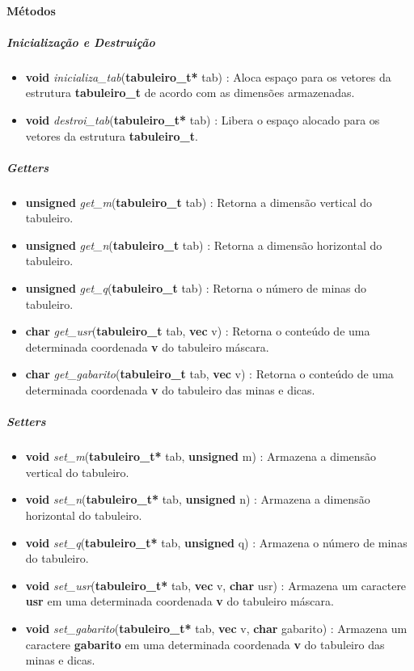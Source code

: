 \documentclass[10pt,a4paper]{report}
\begin{document}
\paragraph{Métodos}
\subparagraph{Inicialização e Destruição}
\begin{itemize}
\item \textbf{void} {\it inicializa\_tab}(\textbf{tabuleiro\_t*} tab) : Aloca espaço para os vetores da estrutura \textbf{tabuleiro\_t} de acordo com as dimensões armazenadas.
\item \textbf{void} {\it destroi\_tab}(\textbf{tabuleiro\_t*} tab) : Libera o espaço alocado para os vetores da estrutura \textbf{tabuleiro\_t}.
\end{itemize}
\subparagraph{\textit{Getters}}
\begin{itemize}
\item \textbf{unsigned} {\it get\_m}(\textbf{tabuleiro\_t} tab) : Retorna a dimensão vertical do tabuleiro.
\item \textbf{unsigned} {\it get\_n}(\textbf{tabuleiro\_t} tab) : Retorna a dimensão horizontal do tabuleiro.
\item \textbf{unsigned} {\it get\_q}(\textbf{tabuleiro\_t} tab) : Retorna o número de minas do tabuleiro.
\item \textbf{char} {\it get\_usr}(\textbf{tabuleiro\_t} tab, \textbf{vec} v) : Retorna o conteúdo de uma determinada coordenada \textbf{v} do tabuleiro máscara.
\item \textbf{char} {\it get\_gabarito}(\textbf{tabuleiro\_t} tab, \textbf{vec} v) : Retorna o conteúdo de uma determinada coordenada \textbf{v} do tabuleiro das minas e dicas.
\end{itemize}
\subparagraph{\textit{Setters}}
\begin{itemize}
\item \textbf{void} {\it set\_m}(\textbf{tabuleiro\_t*} tab, \textbf{unsigned} m) : Armazena a dimensão vertical do tabuleiro.
\item \textbf{void} {\it set\_n}(\textbf{tabuleiro\_t*} tab, \textbf{unsigned} n) : Armazena a dimensão horizontal do tabuleiro.
\item \textbf{void} {\it set\_q}(\textbf{tabuleiro\_t*} tab, \textbf{unsigned} q) : Armazena o número de minas do tabuleiro.
\item \textbf{void} {\it set\_usr}(\textbf{tabuleiro\_t*} tab, \textbf{vec} v, \textbf{char} usr) : Armazena um caractere \textbf{usr} em uma determinada coordenada \textbf{v} do tabuleiro máscara.
\item \textbf{void} {\it set\_gabarito}(\textbf{tabuleiro\_t*} tab, \textbf{vec} v, \textbf{char} gabarito) : Armazena um caractere \textbf{gabarito} em uma determinada coordenada \textbf{v} do tabuleiro das minas e dicas.
\end{itemize}
\end{document}
